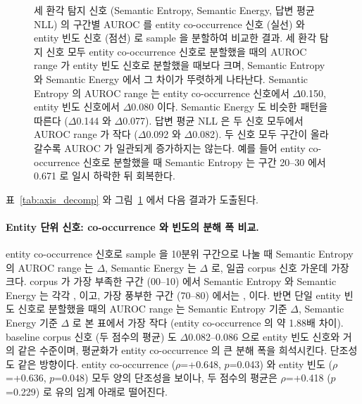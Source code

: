 \documentclass[oneside,ko,under]{snuthesis}
\begin{document}
\begin{figure}[htbp]
    \vspace{2pt}
    \caption[세 환각 탐지 신호와 두 corpus 신호의 구간별 AUROC]{세 환각 탐지 신호 (Semantic Entropy, Semantic Energy, 답변 평균 NLL) 의 구간별 AUROC 를 entity co-occurrence 신호 (실선) 와 entity 빈도 신호 (점선) 로 sample 을 분할하여 비교한 결과. 세 환각 탐지 신호 모두 entity co-occurrence 신호로 분할했을 때의 AUROC range 가 entity 빈도 신호로 분할했을 때보다 크며, Semantic Entropy 와 Semantic Energy 에서 그 차이가 뚜렷하게 나타난다. Semantic Entropy 의 AUROC range 는 entity co-occurrence 신호에서 $\Delta$0.150, entity 빈도 신호에서 $\Delta$0.080 이다. Semantic Energy 도 비슷한 패턴을 따른다 ($\Delta$0.144 와 $\Delta$0.077). 답변 평균 NLL 은 두 신호 모두에서 AUROC range 가 작다 ($\Delta$0.092 와 $\Delta$0.082). 두 신호 모두 구간이 올라갈수록 AUROC 가 일관되게 증가하지는 않는다. 예를 들어 entity co-occurrence 신호로 분할했을 때 Semantic Entropy 는 구간 20--30 에서 0.671 로 일시 하락한 뒤 회복한다.}
    \label{fig:axis_decomp}
\end{figure}

표~\ref{tab:axis_decomp} 와 그림~\ref{fig:axis_decomp} 에서 다음 결과가 도출된다.

\paragraph{Entity 단위 신호: co-occurrence 와 빈도의 분해 폭 비교.}
entity co-occurrence 신호로 sample 을 10분위 구간으로 나눌 때 Semantic Entropy 의 AUROC range 는 $\Delta$\HeadlineEntityPairSEDelta{}, Semantic Energy 는 $\Delta$\HeadlineEntityPairEnergyDelta{} 로, 일곱 corpus 신호 가운데 가장 크다. corpus 가 가장 부족한 구간 (00--10) 에서 Semantic Entropy 와 Semantic Energy 는 각각 \HeadlineEntityPairSELow{}, \HeadlineEntityPairEnergyLow{} 이고, 가장 풍부한 구간 (70--80) 에서는 \HeadlineEntityPairSEHigh{}, \HeadlineEntityPairEnergyHigh{} 이다. 반면 단일 entity 빈도 신호로 분할했을 때의 AUROC range 는 Semantic Entropy 기준 $\Delta$\HeadlineEntityFreqSEDelta{}, Semantic Energy 기준 $\Delta$\HeadlineEntityFreqEnergyDelta{} 로 본 표에서 가장 작다 (entity co-occurrence 의 약 1.88배 차이). baseline corpus 신호 (두 점수의 평균) 도 $\Delta$0.082--0.086 으로 entity 빈도 신호와 거의 같은 수준이며, 평균화가 entity co-occurrence 의 큰 분해 폭을 희석시킨다. 단조성도 같은 방향이다. entity co-occurrence ($\rho$=+0.648, $p$=0.043) 와 entity 빈도 ($\rho$=+0.636, $p$=0.048) 모두 양의 단조성을 보이나, 두 점수의 평균은 $\rho$=+0.418 ($p$=0.229) 로 유의 임계 아래로 떨어진다.
\end{document}
